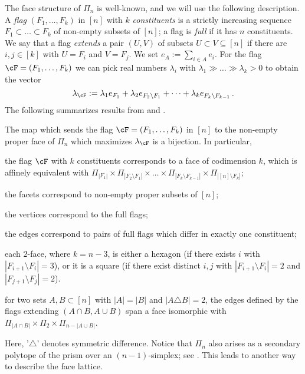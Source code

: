 The face structure of $\Pi_n$ is well-known, and we will use the following description.
A \emph{flag} $(F_1,\dots,F_k)$ in $[n]$ with $k$ \emph{constituents} is a strictly increasing sequence $F_{1}\subset \dots \subset F_{k}$ of non-empty subsets of $[n]$; a flag is \emph{full} if it has $n$ constituents.
We say that a flag \emph{extends} a pair $(U,V)$ of subsets $U \subset V \subseteq [n]$ if there are $i,j \in [k]$ with $U = F_i$ and $V = F_j$.
We set $e_A:= \sum_{i\in A} e_i$.
For the flag $\cF=(F_1,\dots,F_k)$ we can pick real numbers $\lambda_i$ with $\lambda_1 \gg \dots \gg \lambda_k> 0$ to obtain the vector 
\[
\lambda_\cF := \lambda_1 e_{F_1} +\lambda_2 e_{F_2\backslash F_1} +\dots +\lambda_ke_{F_k\backslash F_{k-1}} \, .
\]
The following summarizes results from \cite[Section 3.3(d)]{Fujishige:2005} and \cite[Proposition 1.3]{BilleraSarangarajan:1996}.
\begin{proposition} \label{faces-permutahedron}
	The map which sends the flag $\cF=(F_1,\dots,F_k)$ in $[n]$ to the non-empty proper face of $\Pi_n$ which maximizes $\lambda_\cF$ is a bijection.
	In particular,
	\begin{compactenum}
		\item the flag $\cF$ with $k$ constituents corresponds to a face of codimension $k$, which is affinely equivalent with $\Pi_{|F_1|} \times \Pi_{|F_2 \setminus F_1|} \times \dots \times \Pi_{|F_k \setminus F_{k-1}|} \times \Pi_{|[n] \setminus F_k|}$;
		\item the facets correspond to non-empty proper subsets of $[n]$;
		\item the vertices correspond to the full flags;
		\item the edges correspond to pairs of full flags which differ in exactly one constituent;
		\item each $2$-face, where $k=n-3$, is either a hexagon (if there exists $i$ with $|F_{i+1} \setminus F_i| = 3$), or it is a square (if there exist distinct $i,j$ with $|F_{i+1} \setminus F_i| = 2$ and $|F_{j+1} \setminus F_j| = 2$).
		\item for two sets $A,B \subset [n]$ with $|A| = |B|$ and $|A \triangle B| = 2$, the edges defined by the flags extending $(A \cap B, A \cup B)$ span a face isomorphic with $\Pi_{|A \cap B|} \times \Pi_{2} \times \Pi_{n - |A \cup B|}$.
	\end{compactenum}
\end{proposition}
Here, '$\triangle$' denotes symmetric difference. 
Notice that $\Pi_n$ also arises as a secondary polytope of the prism over an $(n{-}1)$-simplex; see \cite[Theorem 6.2.6]{Triangulations}.
This leads to another way to describe the face lattice.


